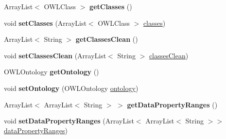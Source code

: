 \begin{DoxyCompactItemize}
\item 
\hypertarget{class_ontology_1_1_data_property_aea2d36c4e8f81fc138c48a46f1ec61f9}{
ArrayList$<$ OWLClass $>$ {\bfseries getClasses} ()}
\label{class_ontology_1_1_data_property_aea2d36c4e8f81fc138c48a46f1ec61f9}

\item 
\hypertarget{class_ontology_1_1_data_property_a0c2910f2ec8dafd7a9ca203ab3475bf8}{
void {\bfseries setClasses} (ArrayList$<$ OWLClass $>$ \hyperlink{class_ontology_1_1_data_property_ad6a04d3cfaaaa1b82b085761e298b1d9}{classes})}
\label{class_ontology_1_1_data_property_a0c2910f2ec8dafd7a9ca203ab3475bf8}

\item 
\hypertarget{class_ontology_1_1_data_property_a3777a294b72063a555b05c3f4340cfaa}{
ArrayList$<$ String $>$ {\bfseries getClassesClean} ()}
\label{class_ontology_1_1_data_property_a3777a294b72063a555b05c3f4340cfaa}

\item 
\hypertarget{class_ontology_1_1_data_property_a0e06a8d6276cf00012241d15d69fecfc}{
void {\bfseries setClassesClean} (ArrayList$<$ String $>$ \hyperlink{class_ontology_1_1_data_property_a425c129759217bc744f9c57d0f2d0c0f}{classesClean})}
\label{class_ontology_1_1_data_property_a0e06a8d6276cf00012241d15d69fecfc}

\item 
\hypertarget{class_ontology_1_1_data_property_a42feee637109118abb6bd0199d6313a7}{
OWLOntology {\bfseries getOntology} ()}
\label{class_ontology_1_1_data_property_a42feee637109118abb6bd0199d6313a7}

\item 
\hypertarget{class_ontology_1_1_data_property_ad26f093fd1421ede84e7c2a6f3d7ff5a}{
void {\bfseries setOntology} (OWLOntology \hyperlink{class_ontology_1_1_data_property_aa05bcaca9a48cd30101617e86f4dda41}{ontology})}
\label{class_ontology_1_1_data_property_ad26f093fd1421ede84e7c2a6f3d7ff5a}

\item 
\hypertarget{class_ontology_1_1_data_property_ae681eb33f0135b022bb3ecd3c3a6ca4f}{
ArrayList$<$ ArrayList$<$ String $>$ $>$ {\bfseries getDataPropertyRanges} ()}
\label{class_ontology_1_1_data_property_ae681eb33f0135b022bb3ecd3c3a6ca4f}

\item 
\hypertarget{class_ontology_1_1_data_property_a5d87ce1a23c51a55e500acffbac08c85}{
void {\bfseries setDataPropertyRanges} (ArrayList$<$ ArrayList$<$ String $>$$>$ \hyperlink{class_ontology_1_1_data_property_a9ffdd8ee11bc8c9a2651e512da2485b7}{dataPropertyRanges})}
\label{class_ontology_1_1_data_property_a5d87ce1a23c51a55e500acffbac08c85}

\end{DoxyCompactItemize}
